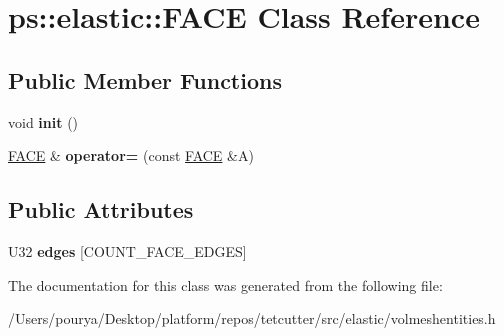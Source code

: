 \hypertarget{classps_1_1elastic_1_1FACE}{}\section{ps\+:\+:elastic\+:\+:F\+A\+C\+E Class Reference}
\label{classps_1_1elastic_1_1FACE}
\subsection*{Public Member Functions}
\begin{DoxyCompactItemize}
\item 
\hypertarget{classps_1_1elastic_1_1FACE_adb7023924bbd764726252b99ad7152d5}{}void {\bfseries init} ()\label{classps_1_1elastic_1_1FACE_adb7023924bbd764726252b99ad7152d5}

\item 
\hypertarget{classps_1_1elastic_1_1FACE_a0b13d2f1b449fbcd04be2ca12287556e}{}\hyperlink{classps_1_1elastic_1_1FACE}{F\+A\+C\+E} \& {\bfseries operator=} (const \hyperlink{classps_1_1elastic_1_1FACE}{F\+A\+C\+E} \&A)\label{classps_1_1elastic_1_1FACE_a0b13d2f1b449fbcd04be2ca12287556e}

\end{DoxyCompactItemize}
\subsection*{Public Attributes}
\begin{DoxyCompactItemize}
\item 
\hypertarget{classps_1_1elastic_1_1FACE_af49f6154c0485dda4666f47d319eb849}{}U32 {\bfseries edges} \mbox{[}C\+O\+U\+N\+T\+\_\+\+F\+A\+C\+E\+\_\+\+E\+D\+G\+E\+S\mbox{]}\label{classps_1_1elastic_1_1FACE_af49f6154c0485dda4666f47d319eb849}

\end{DoxyCompactItemize}


The documentation for this class was generated from the following file\+:\begin{DoxyCompactItemize}
\item 
/\+Users/pourya/\+Desktop/platform/repos/tetcutter/src/elastic/volmeshentities.\+h\end{DoxyCompactItemize}
